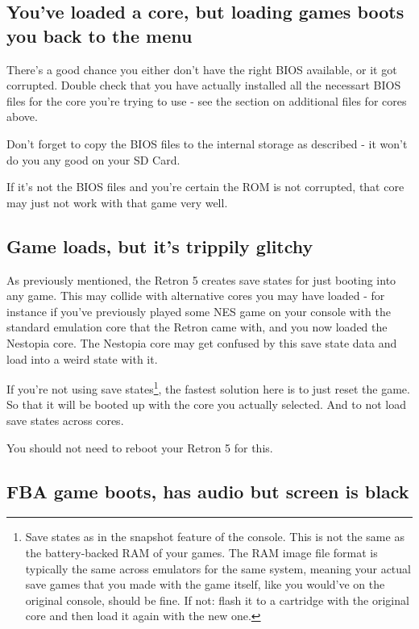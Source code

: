 \documentclass[a4paper]{article}
\begin{document}
\subsection{You've loaded a core, but loading games boots you back to the menu}

There's a good chance you either don't have the right BIOS available, or it got corrupted. Double check that you have actually installed all the necessart BIOS files for the core you're trying to use - see the section on additional files for cores above.

Don't forget to copy the BIOS files to the internal storage as described - it won't do you any good on your SD Card.

If it's not the BIOS files and you're certain the ROM is not corrupted, that core may just not work with that game very well.

\subsection{Game loads, but it's trippily glitchy}

As previously mentioned, the Retron 5 creates save states for just booting into any game. This may collide with alternative cores you may have loaded - for instance if you've previously played some NES game on your console with the standard emulation core that the Retron came with, and you now loaded the Nestopia core. The Nestopia core may get confused by this save state data and load into a weird state with it.

If you're not using save states\footnote{Save states as in the snapshot feature of the console. This is not the same as the battery-backed RAM of your games. The RAM image file format is typically the same across emulators for the same system, meaning your actual save games that you made with the game itself, like you would've on the original console, should be fine. If not: flash it to a cartridge with the original core and then load it again with the new one.}, the fastest solution here is to just reset the game. So that it will be booted up with the core you actually selected. And to not load save states across cores.

You should not need to reboot your Retron 5 for this.

\subsection{FBA game boots, has audio but screen is black}
\end{document}
